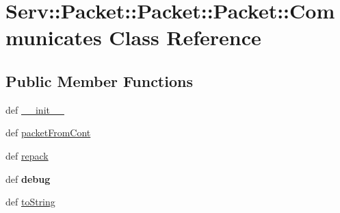 \hypertarget{class_serv_1_1_packet_1_1_packet_1_1_communicates}{
\section{Serv::Packet::Packet::Packet::Communicates Class Reference}
\label{class_serv_1_1_packet_1_1_packet_1_1_communicates}
}
\subsection*{Public Member Functions}
\begin{CompactItemize}
\item 
def \hyperlink{class_serv_1_1_packet_1_1_packet_1_1_communicates_66ff7f1e5bb2594020af9e531007ce07}{\_\-\_\-init\_\-\_\-}
\item 
def \hyperlink{class_serv_1_1_packet_1_1_packet_1_1_communicates_c2cd2b5c092a11d031baaa64ca9c17bb}{packetFromCont}
\item 
def \hyperlink{class_serv_1_1_packet_1_1_packet_1_1_communicates_13619dd95f08e357d87ced2085312096}{repack}
\item 
\hypertarget{class_serv_1_1_packet_1_1_packet_1_1_communicates_1d357dd15272f76bd8dcf55f4abef6d0}{
def \textbf{debug}}
\label{class_serv_1_1_packet_1_1_packet_1_1_communicates_1d357dd15272f76bd8dcf55f4abef6d0}

\item 
def \hyperlink{class_serv_1_1_packet_1_1_packet_1_1_communicates_67b541eba588d3eab311c64dc5575c3b}{toString}
\end{CompactItemize}
